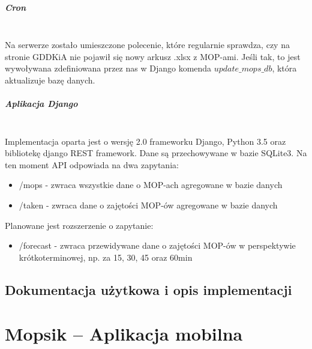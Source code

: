 \paragraph{Cron}\mbox{}\\
Na serwerze zostało umieszczone polecenie, które regularnie sprawdza, czy na stronie GDDKiA nie pojawił się nowy arkusz .xlsx z MOP-ami. Jeśli tak, to jest wywoływana zdefiniowana przez nas w Django komenda $\textit{update\_mops\_db}$, która aktualizuje bazę danych.
\paragraph{Aplikacja Django}\mbox{}\\
Implementacja oparta jest o wersję 2.0 frameworku Django, Python 3.5 oraz bibliotekę django REST framework. Dane są przechowywane w bazie SQLite3. Na ten moment API odpowiada na dwa zapytania:
\begin{itemize}
\item /mops - zwraca wszystkie dane o MOP-ach agregowane w bazie danych
\item /taken - zwraca dane o zajętości MOP-ów agregowane w bazie danych
\end{itemize}
Planowane jest rozszerzenie o zapytanie:
\begin{itemize}
\item /forecast - zwraca przewidywane dane o zajętości MOP-ów w perspektywie krótkoterminowej, np. za 15, 30, 45 oraz 60min
\end{itemize}

\section{Dokumentacja użytkowa i opis implementacji}

\chapter{Mopsik -- Aplikacja mobilna}

